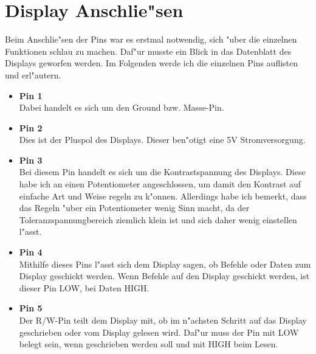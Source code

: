 \documentclass[a4paper]{scrreprt}
\begin{document}
		\section{Display Anschlie"sen}
			Beim Anschlie"sen der Pins war es erstmal notwendig, sich "uber die 
			einzelnen Funktionen schlau zu machen. Daf"ur musste ein Blick in 
			das Datenblatt des Displays geworfen werden. Im Folgenden werde ich die
			einzelnen Pins auflisten und erl"autern.
			
			\begin{itemize}
				\item \textbf{Pin 1} \\
				Dabei handelt es sich um den Ground bzw. Masse-Pin.
				
				\item \textbf{Pin 2} \\
				Dies ist der Pluspol des Displays. Dieser ben"otigt eine 5V 
				Stromversorgung.
				\newpage
				\item \textbf{Pin 3} \\
				Bei diesem Pin handelt es sich um die Kontrastspannung des Displays.
				Diese habe ich an einen Potentiometer angeschlossen, um damit den
				Kontrast auf einfache Art und Weise regeln zu k"onnen. 
				Allerdings habe ich bemerkt, dass das Regeln "uber ein Potentiometer
				wenig Sinn macht, da der Toleranzspannungbereich ziemlich klein ist und sich
				daher wenig einstellen l"asst.
				
				\item \textbf{Pin 4} \\
				Mithilfe dieses Pins l"asst sich dem Display sagen, ob Befehle oder Daten
				zum Display geschickt werden.
				Wenn Befehle auf den Display geschickt werden, ist dieser Pin LOW,
				bei Daten HIGH.
				
				\item \textbf{Pin 5} \\
				Der R/W-Pin teilt dem Display mit, ob im n"achsten Schritt auf das Display
				geschrieben oder vom Display gelesen wird. Daf"ur muss der Pin mit LOW belegt
				sein, wenn geschrieben werden soll und mit HIGH beim Lesen.
				

\end{itemize}
\end{document}
